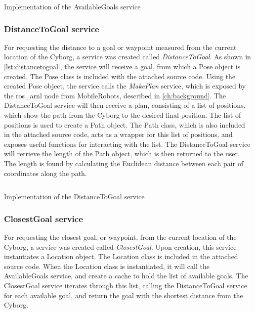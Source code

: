 \documentclass[\rootfolder/main.tex]{subfiles}
\begin{document}
\begin{listing}
    \inputminted[fontsize=\scriptsize]{python}{\rootfolder/Chapters/Chapter6/Listings/available_goals.py}
    \caption{Implementation of the AvailableGoals service \label{lst:availablegoals}}
\end{listing}

\subsubsection{DistanceToGoal service}

For requesting the distance to a goal or waypoint measured from the current location of the Cyborg, a service was created called \emph{DistanceToGoal}.
As shown in \cref{lst:distancetogoal}, the service will receive a goal, from which a Pose object is created.
The Pose class is included with the attached source code.
Using the created Pose object, the service calls the \emph{MakePlan} service, which is exposed by the ros\_arnl node from MobileRobots, described in \cref{ch:background}.
The DistanceToGoal service will then receive a plan, consisting of a list of positions, which show the path from the Cyborg to the desired final position.
The list of positions is used to create a Path object.
The Path class, which is also included in the attached source code, acts as a wrapper for this list of positions, and exposes useful functions for interacting with the list.
The DistanceToGoal service will retrieve the length of the Path object, which is then returned to the user.
The length is found by calculating the Euclidean distance between each pair of coordinates along the path.

\begin{listing}
    \inputminted[fontsize=\scriptsize]{python}{\rootfolder/Chapters/Chapter6/Listings/distance_to_goal.py}
    \caption{Implementation of the DistanceToGoal service \label{lst:distancetogoal}}
\end{listing}

\subsubsection{ClosestGoal service}

For requesting the closest goal, or waypoint, from the current location of the Cyborg, a service was created called \emph{ClosestGoal}.
Upon creation, this service instantiates a Location object.
The Location class is included in the attached source code.
When the Location class is instantiated, it will call the AvailableGoals service, and create a cache to hold the list of available goals.
The ClosestGoal service iterates through this list, calling the DistanceToGoal service for each available goal, and return the goal with the shortest distance from the Cyborg.
\end{document}
